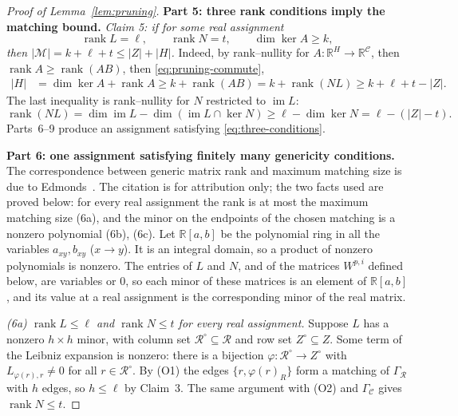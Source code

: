 \documentclass[11pt]{article}
\theoremstyle{remark}
\newcommand{\abs}[1]{\lvert #1\rvert}
\DeclareMathOperator{\rank}{rank}
\DeclareMathOperator{\im}{im}
\newcommand{\R}{\mathbb R}
\newcommand{\Step}[1]{\par\medskip\noindent\textbf{#1}\enspace}
\newcommand{\cR}{\mathcal R}
\newcommand{\cC}{\mathcal C}
\newcommand{\cM}{\mathcal M}
\begin{document}
\begin{proof}[Proof of Lemma~\ref{lem:pruning}]
\Step{Part 5: three rank conditions imply the matching bound.}
\emph{Claim 5: if for some real assignment}
\begin{equation}\label{eq:three-conditions}
 \rank L=\ell,\qquad \rank N=t,\qquad \dim\ker A\geq k,
\end{equation}
\emph{then $\abs{\cM}=k+\ell+t\le\abs Z+\abs H$.}
Indeed, by rank--nullity for $A:\R^H\to\R^{\cC}$, then
$\rank A\ge\rank(AB)$, then \eqref{eq:pruning-commute},
\begin{align}
 \abs H
 &=\dim\ker A+\rank A
 \geq k+\rank(AB)= k+\rank(NL)
 \geq k+\ell+t-\abs Z.
 \label{eq:pruning-rank-bound}
\end{align}
The last inequality is rank--nullity for $N$ restricted to $\im L$:
\[
 \rank(NL)
 =\dim\im L-\dim(\im L\cap\ker N)
 \geq\ell-\dim\ker N=\ell-(\abs Z-t).
\]
Parts~6--9 produce an assignment satisfying \eqref{eq:three-conditions}.

\Step{Part 6: one assignment satisfying finitely many genericity conditions.}
The correspondence between generic matrix rank and maximum matching size is
due to Edmonds~\cite[Section~5, Theorem~1]{Edmonds1967}. The citation is for
attribution only; the two facts used are proved below: for every real
assignment the rank is at most the maximum matching size (6a), and the minor
on the endpoints of the chosen matching is a nonzero polynomial (6b), (6c).
Let $\R[a,b]$ be the polynomial ring in all the variables
$a_{xy},b_{xy}$ ($x\to y$). It is an integral domain, so a product of
nonzero polynomials is nonzero. The entries of $L$ and $N$, and of the
matrices $W^{p,i}$ defined below, are variables or $0$, so each minor of
these matrices is an element of $\R[a,b]$, and its value at a real
assignment is the corresponding minor of the real matrix.

\smallskip\noindent\emph{(6a) $\rank L\le\ell$ and $\rank N\le t$ for every
real assignment.} Suppose $L$ has a nonzero $h\times h$ minor, with column
set $\cR^{\circ}\subseteq\cR$ and row set $Z^{\circ}\subseteq Z$. Some term
of the Leibniz expansion is nonzero: there is a bijection
$\varphi:\cR^{\circ}\to Z^{\circ}$ with $L_{\varphi(r),r}\ne0$ for all
$r\in\cR^{\circ}$. By (O1) the edges $\{r,\varphi(r)_R\}$ form a matching
of $\Gamma_{\cR}$ with $h$ edges, so $h\le\ell$ by Claim~3. The same
argument with (O2) and $\Gamma_{\cC}$ gives $\rank N\le t$.


\end{proof}
\end{document}
